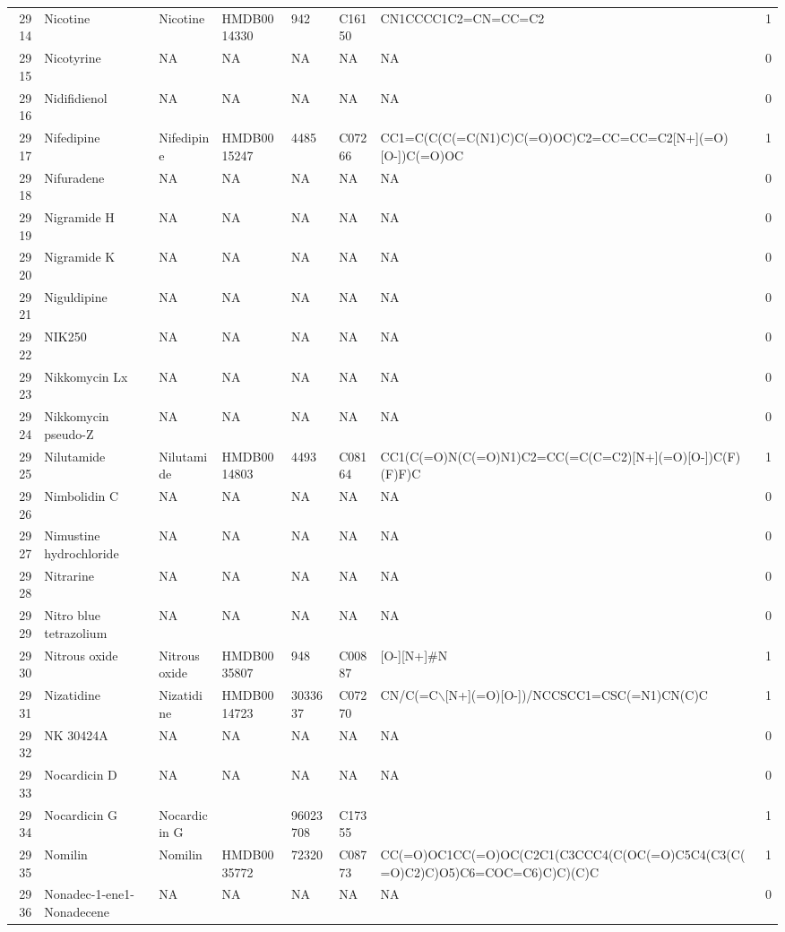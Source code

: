 \documentclass[a4paper]{article}
\begin{document}
\begin{longtable}{rlllllll}
  2914 & Nicotine & Nicotine & HMDB0014330 & 942 & C16150 & CN1CCCC1C2=CN=CC=C2 & 1 \\ 
  2915 & Nicotyrine & NA & NA & NA & NA & NA & 0 \\ 
  2916 & Nidifidienol & NA & NA & NA & NA & NA & 0 \\ 
  2917 & Nifedipine & Nifedipine & HMDB0015247 & 4485 & C07266 & CC1=C(C(C(=C(N1)C)C(=O)OC)C2=CC=CC=C2[N+](=O)[O-])C(=O)OC & 1 \\ 
  2918 & Nifuradene & NA & NA & NA & NA & NA & 0 \\ 
  2919 & Nigramide H & NA & NA & NA & NA & NA & 0 \\ 
  2920 & Nigramide K & NA & NA & NA & NA & NA & 0 \\ 
  2921 & Niguldipine & NA & NA & NA & NA & NA & 0 \\ 
  2922 & NIK250 & NA & NA & NA & NA & NA & 0 \\ 
  2923 & Nikkomycin Lx & NA & NA & NA & NA & NA & 0 \\ 
  2924 & Nikkomycin pseudo-Z & NA & NA & NA & NA & NA & 0 \\ 
  2925 & Nilutamide & Nilutamide & HMDB0014803 & 4493 & C08164 & CC1(C(=O)N(C(=O)N1)C2=CC(=C(C=C2)[N+](=O)[O-])C(F)(F)F)C & 1 \\ 
  2926 & Nimbolidin C & NA & NA & NA & NA & NA & 0 \\ 
  2927 & Nimustine hydrochloride & NA & NA & NA & NA & NA & 0 \\ 
  2928 & Nitrarine & NA & NA & NA & NA & NA & 0 \\ 
  2929 & Nitro blue tetrazolium & NA & NA & NA & NA & NA & 0 \\ 
  2930 & Nitrous oxide & Nitrous oxide & HMDB0035807 & 948 & C00887 & [O-][N+]\#N & 1 \\ 
  2931 & Nizatidine & Nizatidine & HMDB0014723 & 3033637 & C07270 & CN/C(=C$\backslash$[N+](=O)[O-])/NCCSCC1=CSC(=N1)CN(C)C & 1 \\ 
  2932 & NK 30424A & NA & NA & NA & NA & NA & 0 \\ 
  2933 & Nocardicin D & NA & NA & NA & NA & NA & 0 \\ 
  2934 & Nocardicin G & Nocardicin G &  & 96023708 & C17355 &  & 1 \\ 
  2935 & Nomilin & Nomilin & HMDB0035772 & 72320 & C08773 & CC(=O)OC1CC(=O)OC(C2C1(C3CCC4(C(OC(=O)C5C4(C3(C(=O)C2)C)O5)C6=COC=C6)C)C)(C)C & 1 \\ 
  2936 & Nonadec-1-ene1-Nonadecene & NA & NA & NA & NA & NA & 0 \\ 

\end{longtable}
\end{document}

